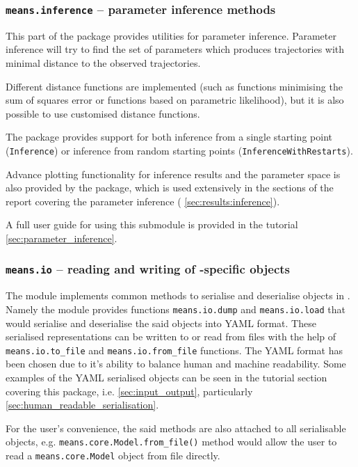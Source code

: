 \subsubsection{{\tt means.inference} -- parameter inference methods}
This part of the package provides utilities for parameter inference.
Parameter inference will try to find the set of parameters which
produces trajectories with minimal distance to the observed trajectories.

Different distance functions are implemented (such as functions minimising the sum of squares error
or functions based on parametric likelihood), but it is also possible to use customised distance functions.

The package provides support for both inference from a single starting point (\verb"Inference")
or inference from random starting points (\verb"InferenceWithRestarts").

Advance plotting functionality for inference results and the parameter space is also provided by the package, which is used extensively in the sections of the report covering the parameter inference (\eg{} \autoref{sec:results:inference}). 

A full user guide for using this submodule is provided in the tutorial \autoref{sec:parameter_inference}.

\subsubsection{{\tt means.io} -- reading and writing of \means-specific objects}
The module implements common methods to serialise and deserialise objects in \means.
Namely the module provides functions \verb`means.io.dump` and  \verb`means.io.load` that would
serialise and deserialise the said objects into YAML format\cite{_official_????}.
These serialised representations can be written to or read from files with the help of
\verb`means.io.to_file` and \verb`means.io.from_file` functions.
The YAML format has been chosen due to it's ability to balance human and machine readability. 
Some examples of the YAML serialised objects can be seen in the tutorial section covering this package, i.e. \autoref{sec:input_output}, particularly \autoref{sec:human_readable_serialisation}.

For the user's convenience, the said methods are also attached to all serialisable objects,
e.g. \verb`means.core.Model.from_file()` method would allow the user to read a \verb`means.core.Model` object from file directly.

